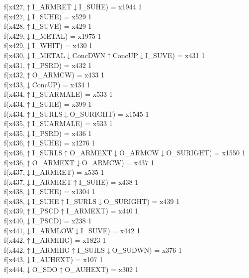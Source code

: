 f(x427,$\uparrow$I\_ARMRET$\downarrow$I\_SUHE) = x1944 {1} \\
f(x427,$\downarrow$I\_SUHE) = x529 {1} \\
f(x428,$\uparrow$I\_SUVE) = x429 {1} \\
f(x429,$\downarrow$I\_METAL) = x1975 {1} \\
f(x429,$\downarrow$I\_WHIT) = x430 {1} \\
f(x430,$\downarrow$I\_METAL$\downarrow$ConcDWN$\uparrow$ConcUP$\downarrow$I\_SUVE) = x431 {1} \\
f(x431,$\uparrow$I\_PSRD) = x432 {1} \\
f(x432,$\uparrow$O\_ARMCW) = x433 {1} \\
f(x433,$\downarrow$ConcUP) = x434 {1} \\
f(x434,$\uparrow$I\_SUARMALE) = x533 {1} \\
f(x434,$\uparrow$I\_SUHE) = x399 {1} \\
f(x434,$\uparrow$I\_SURLS$\downarrow$O\_SURIGHT) = x1545 {1} \\
f(x435,$\uparrow$I\_SUARMALE) = x533 {1} \\
f(x435,$\downarrow$I\_PSRD) = x436 {1} \\
f(x436,$\uparrow$I\_SUHE) = x1276 {1} \\
f(x436,$\uparrow$I\_SURLS$\uparrow$O\_ARMEXT$\downarrow$O\_ARMCW$\downarrow$O\_SURIGHT) = x1550 {1} \\
f(x436,$\uparrow$O\_ARMEXT$\downarrow$O\_ARMCW) = x437 {1} \\
f(x437,$\downarrow$I\_ARMRET) = x535 {1} \\
f(x437,$\downarrow$I\_ARMRET$\uparrow$I\_SUHE) = x438 {1} \\
f(x438,$\downarrow$I\_SUHE) = x1304 {1} \\
f(x438,$\downarrow$I\_SUHE$\uparrow$I\_SURLS$\downarrow$O\_SURIGHT) = x439 {1} \\
f(x439,$\uparrow$I\_PSCD$\uparrow$I\_ARMEXT) = x440 {1} \\
f(x440,$\downarrow$I\_PSCD) = x238 {1} \\
f(x441,$\downarrow$I\_ARMLOW$\downarrow$I\_SUVE) = x442 {1} \\
f(x442,$\uparrow$I\_ARMHIG) = x1823 {1} \\
f(x442,$\uparrow$I\_ARMHIG$\uparrow$I\_SUILS$\downarrow$O\_SUDWN) = x376 {1} \\
f(x443,$\downarrow$I\_AUHEXT) = x107 {1} \\
f(x444,$\downarrow$O\_SDO$\uparrow$O\_AUHEXT) = x302 {1} \\
